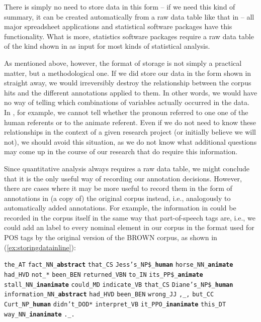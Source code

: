There is simply no need to store  data in this form -- if we need this kind of summary, it can be created automatically from a raw data table like that in  -- all major spreadsheet applications and statistical software packages have this functionality. What is more, statistics  software packages require a raw data table of the kind shown in  as input for most kinds of statistical analysis.

As mentioned above, however, the format of storage  is not simply a practical matter, but a methodological one. If we did store our data in the form shown in  straight away, we would irreversibly destroy the relationship between the corpus hits  and the different annotations  applied to them. In other words, we would have no way of telling which combinations of variables actually occurred in the data. In , for example, we cannot tell whether the pronoun  referred to one one of the human  referents or to the animate referent. Even if we do not need to know these relationships in the context of a given research project (or initially believe we will not), we should avoid this situation, as we do not know what additional questions may come up in the course of our research that do require this information.

Since quantitative  analysis always requires a raw data table, we might conclude that it is the only useful way of recording our annotation decisions. However, there are cases where it may be more useful to record them in the form of annotations  in (a copy of) the original corpus instead, i.e., analogously to automatically added annotations. For example, the information in  could be recorded in the corpus itself in the same way that part\hyp{}of\hyp{}speech tags are, i.e., we could add an   label to every nominal  element in our corpus in the format used for POS tags by the original version of the BROWN  corpus, as shown in (\ref{ex:storingdatainline}):

\begin{exe}
\ex\label{ex:storingdatainline}\begin{minipage}[t]{\linewidth} \raggedright \texttt{the\_AT} \texttt{fact\_NN\_\textbf{abstract}} \texttt{that\_CS} \texttt{Jess's\_NP\$\_\textbf{human}} \texttt{horse\_NN\_\textbf{animate}} \texttt{had\_HVD} \texttt{not\_*} \texttt{been\_BEN} \texttt{returned\_VBN} \texttt{to\_IN} \texttt{its\_PP\$\_\textbf{animate}} \texttt{stall\_NN\_\textbf{inanimate}} \texttt{could\_MD} \texttt{indicate\_VB} \texttt{that\_CS} \texttt{Diane's\_NP\$\_\textbf{human}} \texttt{information\_NN\_\textbf{abstract}} \texttt{had\_HVD} \texttt{been\_BEN} \texttt{wrong\_JJ} \texttt{,\_,} \texttt{but\_CC} \texttt{Curt\_NP\_\textbf{human}} \texttt{didn't\_DOD*} \texttt{interpret\_VB} \texttt{it\_PPO\_\textbf{inanimate}} \texttt{this\_DT} \texttt{way\_NN\_\textbf{inanimate}} \texttt{.\_.}\end{minipage}%
\end{exe}

